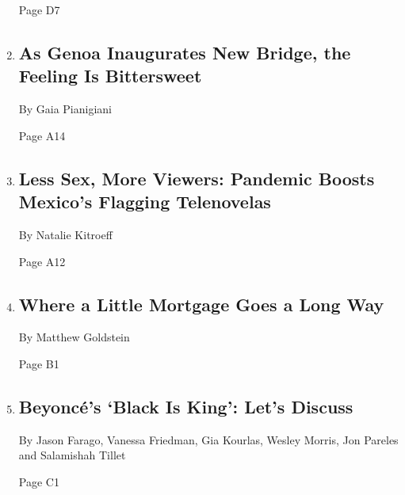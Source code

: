 \begin{enumerate}
  Page D7
\item
  \href{/2020/08/02/world/europe/genoa-Morandi-bridge-replacement.html}{}

  \hypertarget{as-genoa-inaugurates-new-bridge-the-feeling-is-bittersweet}{%
  \subsection{As Genoa Inaugurates New Bridge, the Feeling Is
  Bittersweet}\label{as-genoa-inaugurates-new-bridge-the-feeling-is-bittersweet}}

  By Gaia Pianigiani

  Page A14
\item
  \href{/2020/08/02/world/americas/mexico-tv-virus-telenovela.html}{}

  \hypertarget{less-sex-more-viewers-pandemic-boosts-mexicos-flagging-telenovelas}{%
  \subsection{Less Sex, More Viewers: Pandemic Boosts Mexico's Flagging
  Telenovelas}\label{less-sex-more-viewers-pandemic-boosts-mexicos-flagging-telenovelas}}

  By Natalie Kitroeff

  Page A12
\item
  \href{/2020/08/02/business/mortgages-affordable-housing.html}{}

  \hypertarget{where-a-little-mortgage-goes-a-long-way}{%
  \subsection{Where a Little Mortgage Goes a Long
  Way}\label{where-a-little-mortgage-goes-a-long-way}}

  By Matthew Goldstein

  Page B1
\item
  \href{/2020/07/31/arts/music/beyonce-black-is-king.html}{}

  \hypertarget{beyoncuxe9s-black-is-king-lets-discuss}{%
  \subsection{Beyoncé's `Black Is King': Let's
  Discuss}\label{beyoncuxe9s-black-is-king-lets-discuss}}

  By Jason Farago, Vanessa Friedman, Gia Kourlas, Wesley Morris, Jon
  Pareles and Salamishah Tillet

  Page C1
\end{enumerate}


